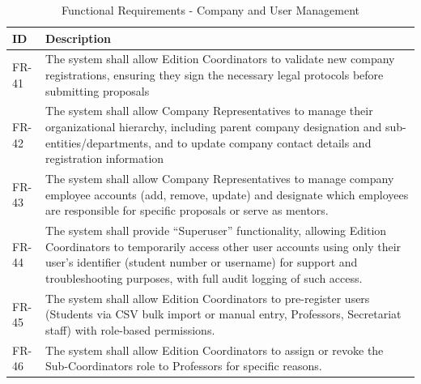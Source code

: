 {
    \begin{table}[H]
        \centering
        \caption{Functional Requirements - Company and User Management}
        \begin{tabular}{|l|p{12cm}|} %
            \hline
            \textbf{ID} & \textbf{Description} \\ \hline
            FR-41 & The system shall allow Edition Coordinators to validate new company registrations, ensuring they sign the necessary legal protocols before submitting proposals \\ \hline
            FR-42 & The system shall allow Company Representatives to manage their organizational hierarchy, including parent company designation and sub-entities/departments, and to update company contact  details and registration information \\ \hline
            FR-43 & The system shall allow Company Representatives to manage company employee accounts (add, remove, update) and designate which employees are responsible for specific proposals or serve as mentors. \\ \hline
            FR-44 & The system shall provide “Superuser” functionality, allowing Edition Coordinators to temporarily access other user accounts using only their user’s identifier (student number or username) for support and troubleshooting purposes, with full audit logging of such access. \\ \hline
            FR-45 & The system shall allow Edition Coordinators to pre-register users (Students via CSV bulk import or manual entry, Professors, Secretariat staff) with role-based permissions. \\ \hline
            FR-46 & The system shall allow Edition Coordinators to assign or revoke the Sub-Coordinators role to Professors for specific reasons. \\ \hline
        \end{tabular}
    \end{table}    
}

